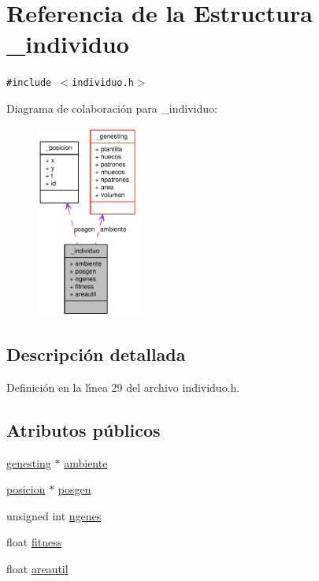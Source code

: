 \hypertarget{struct__individuo}{
\section{Referencia de la Estructura \_\-individuo}
\label{struct__individuo}
}
{\tt \#include $<$individuo.h$>$}

Diagrama de colaboraci\'{o}n para \_\-individuo:\begin{figure}[H]
\begin{center}
\leavevmode
\includegraphics[width=99pt]{struct__individuo__coll__graph}
\end{center}
\end{figure}


\subsection{Descripci\'{o}n detallada}




Definici\'{o}n en la l\'{\i}nea 29 del archivo individuo.h.\subsection*{Atributos p\'{u}blicos}
\begin{CompactItemize}
\item 
\hyperlink{struct__genesting}{genesting} $\ast$ \hyperlink{struct__individuo_77db4f35b317761eeb9a0cb2b8f8276d_77db4f35b317761eeb9a0cb2b8f8276d}{ambiente}
\item 
\hyperlink{struct__posicion}{posicion} $\ast$ \hyperlink{struct__individuo_2187e821ff69e7e3de9fa511745f976a_2187e821ff69e7e3de9fa511745f976a}{posgen}
\item 
unsigned int \hyperlink{struct__individuo_6ca41cfab8bba8bd7c2ba8f44d2407f1_6ca41cfab8bba8bd7c2ba8f44d2407f1}{ngenes}
\item 
float \hyperlink{struct__individuo_afa717374da03fa5ef2c5ac8c08e1daa_afa717374da03fa5ef2c5ac8c08e1daa}{fitness}
\item 
float \hyperlink{struct__individuo_81afc3d6d6f5394611dcd09a418ee828_81afc3d6d6f5394611dcd09a418ee828}{areautil}
\end{CompactItemize}


